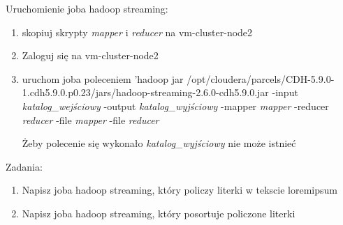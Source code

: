 \documentclass[11pt]{article}
\begin{document}
Uruchomienie joba hadoop streaming:
\begin{enumerate}
\item skopiuj skrypty \textit{mapper} i \textit{reducer} na vm-cluster-node2
\item Zaloguj się na vm-cluster-node2
\item uruchom joba poleceniem 'hadoop jar /opt/cloudera/parcels/CDH-5.9.0-1.cdh5.9.0.p0.23/jars/hadoop-streaming-2.6.0-cdh5.9.0.jar -input \textit{katalog\_wejściowy} -output \textit{katalog\_wyjściowy} -mapper \textit{mapper} -reducer \textit{reducer} -file \textit{mapper} -file \textit{reducer}

Żeby polecenie się wykonało \textit{katalog\_wyjściowy} nie może istnieć
\end{enumerate}

Zadania:
\begin{enumerate}
\item Napisz joba hadoop streaming, który policzy literki w tekscie loremipsum
\item Napisz joba hadoop streaming, który posortuje policzone literki
\end{enumerate}
\end{document}
